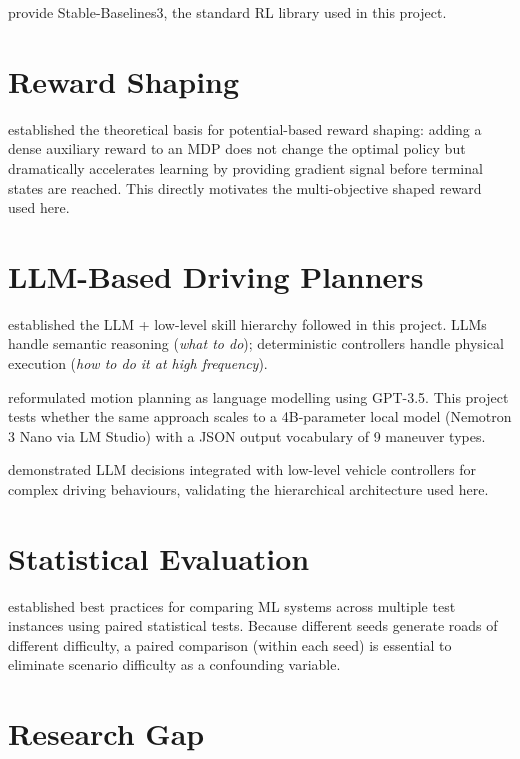 \documentclass[12pt,a4paper]{report}
\begin{document}
\citet{raffin2021sb3} provide Stable-Baselines3, the standard RL library used in this project.

\section{Reward Shaping}

\citet{ng1999reward} established the theoretical basis for potential-based reward shaping: adding a dense auxiliary reward to an MDP does not change the optimal policy but dramatically accelerates learning by providing gradient signal before terminal states are reached. This directly motivates the multi-objective shaped reward used here.

\section{LLM-Based Driving Planners}

\citet{ahn2022saycan} established the LLM + low-level skill hierarchy followed in this project. LLMs handle semantic reasoning (\textit{what to do}); deterministic controllers handle physical execution (\textit{how to do it at high frequency}).

\citet{mao2023gptdriver} reformulated motion planning as language modelling using GPT-3.5. This project tests whether the same approach scales to a 4B-parameter local model (Nemotron 3 Nano via LM Studio) with a JSON output vocabulary of 9 maneuver types.

\citet{sha2023languagempc} demonstrated LLM decisions integrated with low-level vehicle controllers for complex driving behaviours, validating the hierarchical architecture used here.

\section{Statistical Evaluation}

\citet{demskar2006statistical} established best practices for comparing ML systems across multiple test instances using paired statistical tests. Because different seeds generate roads of different difficulty, a paired comparison (within each seed) is essential to eliminate scenario difficulty as a confounding variable.

\section{Research Gap}
\end{document}

